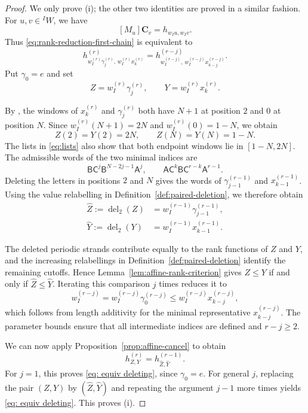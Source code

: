 \documentclass[11pt,a4paper,reqno]{amsart}
\numberwithin{equation}{section}
\theoremstyle{definition}
\theoremstyle{remark}
\theoremstyle{plain}
\newcommand{\C}{\mathbf C}
\newcommand{\A}{\mathsf A}
\newcommand{\B}{\mathsf B}
\newcommand{\CC}{\mathsf C}
\begin{document}
\begin{proof}
We only prove \textup{(i)}; the other two identities are proved
in a similar fashion.
For $u,v\in{}^I W$, we have
\[
 [M_u]\C_v=h_{w_Iu,w_Iv}.
\]
Thus \eqref{eq:rank-reduction-first-chain} is equivalent to
\begin{equation}\label{eq: equiv deleting}
 h^{(r)}_{w_I^{(r)}\gamma_j^{(r)},\,w_I^{(r)}x_k^{(r)}}
 =h^{(r-j)}_{w_I^{(r-j)},\,w_I^{(r-j)}x_{k-j}^{(r-j)}}.
\end{equation}
Put $\gamma_0=e$ and set
\[
 Z=w_I^{(r)}\gamma_j^{(r)},\qquad
 Y=w_I^{(r)}x_k^{(r)}.
\]

By , the windows of $x_k^{(r)}$ and
$\gamma_j^{(r)}$ both have $N+1$ at position $2$ and $0$ at
position $N$. Since $w_I^{(r)}(N+1)=2N$ and
$w_I^{(r)}(0)=1-N$, we obtain
\[
 Z(2)=Y(2)=2N,\qquad Z(N)=Y(N)=1-N.
\]
The lists in \eqref{eq:lists} also show that both endpoint windows
lie in $[1-N,2N]$.
The admissible words of the two minimal indices are
\[
 \B\CC^j\B^{N-2j-1}\A^j,\qquad
 \A\CC^k\B\CC^{r-k}\A^{r-1}.
\]
Deleting the letters in positions $2$ and $N$ gives the words of
$\gamma_{j-1}^{(r-1)}$ and $x_{k-1}^{(r-1)}$.
Using the value relabelling in Definition~\ref{def:paired-deletion},
we therefore obtain
\[
\begin{aligned}
 \widehat Z:=\operatorname{del}_2(Z)
 &=w_I^{(r-1)}\gamma_{j-1}^{(r-1)},\\
 \widehat Y:=\operatorname{del}_2(Y)
 &=w_I^{(r-1)}x_{k-1}^{(r-1)}.
\end{aligned}
\]

The deleted periodic strands contribute equally to the rank functions
of $Z$ and $Y$, and the increasing relabellings in
Definition~\ref{def:paired-deletion} identify the remaining cutoffs.
Hence Lemma~\ref{lem:affine-rank-criterion} gives $Z\leq Y$ if and
only if $\widehat Z\leq\widehat Y$.
Iterating this comparison $j$ times reduces it to
\[
 w_I^{(r-j)}=w_I^{(r-j)}\gamma_0^{(r-j)}
 \leq w_I^{(r-j)}x_{k-j}^{(r-j)},
\]
which follows from length additivity for the minimal representative
$x_{k-j}^{(r-j)}$. The parameter bounds ensure that all intermediate
indices are defined and $r-j\geq2$.

We can now apply Proposition~\ref{prop:affine-cancel} to obtain
\begin{equation}
 h_{Z,Y}^{(r)}=h_{\widehat Z,\widehat Y}^{(r-1)}.
\end{equation}
For $j=1$, this proves \eqref{eq: equiv deleting}, since
$\gamma_0=e$. For general $j$, replacing the pair $(Z,Y)$ by
$(\widehat Z,\widehat Y)$ and repeating the argument $j-1$ more
times yields \eqref{eq: equiv deleting}. This proves \textup{(i)}.
\end{proof}
\end{document}
